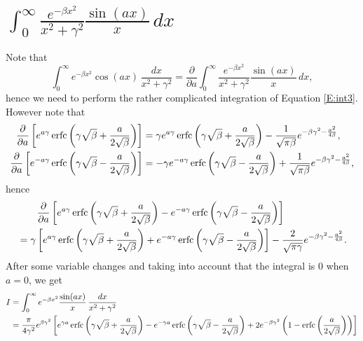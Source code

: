\section{ $ \int_0^{\infty} \frac{e^{-\beta x^2}}{x^2+\gamma^2}
\frac{\sin(ax)}{x}\, dx  $ }
Note that 
\[
  \int_0^{\infty} e^{-\beta x^2} \cos(a x) \, \frac{dx}{x^2+\gamma^2}
    = \frac{\partial}{\partial a} 
        \int_0^{\infty} \frac{e^{-\beta x^2}}{x^2+\gamma^2} 
                        \frac{\sin(ax)}{x}\, dx,
\] 
hence we need to perform the rather complicated integration of Equation
\ref{E:int3}. However note that
\begin{align*}
  \frac{\partial}{\partial a}  
    \left[
      e^{a \gamma} 
      \operatorname*{erfc} \left( \gamma \sqrt{\beta} + \frac{a}{2\sqrt{\beta}} \right)
    \right]
  &= \gamma e^{a \gamma} 
       \operatorname*{erfc} \left( \gamma \sqrt{\beta} + \frac{a}{2\sqrt{\beta}} \right)
     - \frac{1}{\sqrt{\pi \beta}} e^{-\beta \gamma^2 - \frac{a^2}{4\beta}},  \\
  \frac{\partial}{\partial a}  
    \left[
      e^{-a \gamma} 
      \operatorname*{erfc} \left( \gamma \sqrt{\beta} - \frac{a}{2\sqrt{\beta}} \right)
    \right]
  &= - \gamma e^{-a \gamma} 
       \operatorname*{erfc} \left( \gamma \sqrt{\beta} - \frac{a}{2\sqrt{\beta}} \right)
     + \frac{1}{\sqrt{\pi \beta}} e^{-\beta \gamma^2 - \frac{a^2}{4\beta}}, 
\end{align*}
hence
\begin{align*}
  &\qquad \frac{\partial}{\partial a}  
    \left[
      e^{a \gamma} 
        \operatorname*{erfc} \left( \gamma \sqrt{\beta} + \frac{a}{2\sqrt{\beta}} \right)
      - e^{-a \gamma} 
        \operatorname*{erfc} \left( \gamma \sqrt{\beta} - \frac{a}{2\sqrt{\beta}} \right)
    \right] \\
  &= \gamma 
    \left[
      e^{a \gamma} 
        \operatorname*{erfc} \left( \gamma \sqrt{\beta} + \frac{a}{2\sqrt{\beta}} \right)
      + e^{-a \gamma} 
        \operatorname*{erfc} \left( \gamma \sqrt{\beta} - \frac{a}{2\sqrt{\beta}} \right)
    \right]
    - \frac{2}{\sqrt{\pi \gamma}} e^{-\beta \gamma^2 - \frac{a^2}{4\beta}}.
\end{align*}
After some variable changes and taking into account that the integral is 0 
when $a=0$, we get
\begin{align} 
  I &=\int_0^{\infty} e^{-\beta x^2} \frac{\sin(a x)}{x} \, \frac{dx}{x^2+\gamma^2} 
     \label{E:int5}  \\
  & = \frac{\pi}{4\gamma^2} e^{\beta \gamma^2}
      \left[
        e^{\gamma a} 
          \operatorname*{erfc} \left( \gamma \sqrt{\beta} + \frac{a}{2\sqrt{\beta}} \right)
        - e^{-\gamma a} 
          \operatorname*{erfc} \left( \gamma \sqrt{\beta} - \frac{a}{2\sqrt{\beta}} \right)
        + 2 e^{-\beta \gamma^2} \left( 1- \operatorname*{erfc} \left( \frac{a}{2\sqrt{\beta}} \right) \right)
      \right]  \notag
\end{align}



